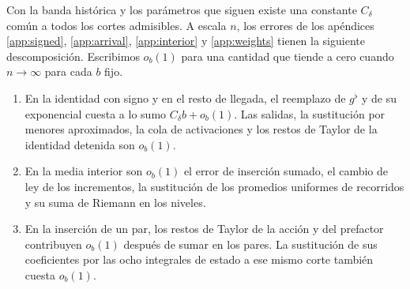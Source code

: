 \begin{proposicion}\label{prop:cortes-uniformes}
Con la banda histórica y los parámetros que siguen existe una constante \(C_\delta\)
común a todos los cortes admisibles. A escala \(n\), los errores de los apéndices
\ref{app:signed}, \ref{app:arrival}, \ref{app:interior} y \ref{app:weights} tienen
la siguiente descomposición. Escribimos \(o_b(1)\) para una cantidad que tiende a cero
cuando \(n\to\infty\) para cada \(b\) fijo.
\begin{enumerate}
\item En la identidad con signo y en el resto de llegada, el reemplazo de \(g^\flat\)
y de su exponencial cuesta a lo sumo \(C_\delta b+o_b(1)\).
Las salidas, la sustitución por menores aproximados, la cola de activaciones y los
restos de Taylor de la identidad detenida son \(o_b(1)\).
\item En la media interior son \(o_b(1)\) el error de inserción sumado, el cambio
de ley de los incrementos, la sustitución de los promedios uniformes de recorridos
y su suma de Riemann en los niveles.
\item En la inserción de un par, los restos de Taylor de la acción y del prefactor
contribuyen \(o_b(1)\) después de sumar en los pares. La sustitución de sus coeficientes
por las ocho integrales de estado a ese mismo corte también cuesta \(o_b(1)\).
\end{enumerate}
\end{proposicion}
